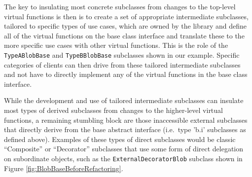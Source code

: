 \documentclass[pdf,ps2pdf,11pt]{SANDreport}
\begin{document}
The key to insulating most concrete subclasses from changes to the top-level
virtual functions is then is to create a set of appropriate intermediate
subclasses, tailored to specific types of use cases, which are owned by the
library and define all of the virtual functions on the base class interface
and translate these to the more specific use cases with other virtual
functions.  This is the role of the {}\texttt{Type\-A\-Blob\-Base} and
{}\texttt{Type\-B\-Blob\-Base} subclasses shown in our example.  Specific
categories of clients can then drive from these tailored intermediate
subclasses and not have to directly implement any of the virtual functions in
the base class interface.

While the development and use of tailored intermediate subclasses can insulate
most types of derived subclasses from changes to the higher-level virtual
functions, a remaining stumbling block are those inaccessible external
subclasses that directly derive from the base abstract interface (i.e.\ type
'b.i' subclasses as defined above).  Examples of these types of direct
subclasses would be classic ``Composite'' or ``Decorator'' subclasses that use
some form of direct delegation on subordinate objects, such as the
{}\texttt{External\-Decorator\-Blob} subclass shown in Figure
{}\ref{fig:BlobBaseBeforeRefactoring}.
\end{document}
